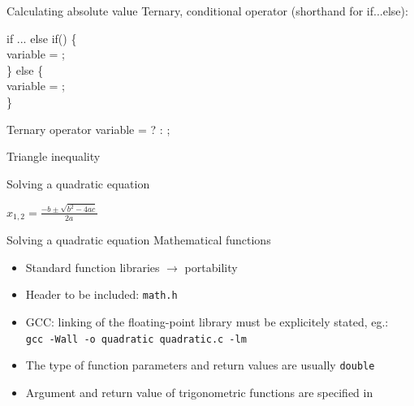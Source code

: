 \documentclass[usenames,dvipsnames,aspectratio=169]{beamer}
\begin{document}
\begin{frame}{Calculating absolute value}
  Ternary, conditional operator (shorthand for if...else): 
  \begin{exampleblock}{if ... else}
    if() \{\\
    \hspace{0.5cm} variable = ;\\
    \} else \{\\
    \hspace{0.5cm} variable = ;\\
    \}
  \end{exampleblock}
  \begin{exampleblock}{Ternary operator}
    variable =  ?  : ;
  \end{exampleblock}
\end{frame}

\begin{frame}{Triangle inequality}
  \begin{exampleblock}{}
    \tiny
    \vspace{-.3cm}
    
    \vspace{-.3cm}
  \end{exampleblock}
\end{frame}

\begin{frame}{Solving a quadratic equation}
  \begin{exampleblock}{ $x_{1,2} = \frac{-b\pm\sqrt{b^2 - 4ac}}{2a}$}
    \tiny
    
  \end{exampleblock}
\end{frame}

\begin{frame}{Solving a quadratic equation}
  Mathematical functions
  \begin{itemize}
    \item Standard function libraries $\rightarrow$ portability
    \item Header to be included: \texttt{math.h}
    \item GCC: linking of the floating-point library must be explicitely stated, eg.:\\
    \texttt{gcc -Wall -o quadratic quadratic.c -lm }
    \item The type of function parameters and return values are usually \texttt{double}
    \item Argument and return value of trigonometric functions are specified in 
  \end{itemize}
\end{frame}
\end{document}
